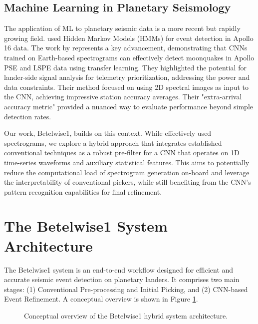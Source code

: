 \documentclass[11pt,a4paper]{article}
\begin{document}
\subsection{Machine Learning in Planetary Seismology}
The application of ML to planetary seismic data is a more recent but rapidly growing field. \citet{knapmeyer2015identification} used Hidden Markov Models (HMMs) for event detection in Apollo 16 data. The work by \citet{civilini2021detecting} represents a key advancement, demonstrating that CNNs trained on Earth-based spectrograms can effectively detect moonquakes in Apollo PSE and LSPE data using transfer learning. They highlighted the potential for lander-side signal analysis for telemetry prioritization, addressing the power and data constraints. Their method focused on using 2D spectral images as input to the CNN, achieving impressive station accuracy averages. Their "extra-arrival accuracy metric" provided a nuanced way to evaluate performance beyond simple detection rates.

Our work, Betelwise1, builds on this context. While \citet{civilini2021detecting} effectively used spectrograms, we explore a hybrid approach that integrates established conventional techniques as a robust pre-filter for a CNN that operates on 1D time-series waveforms and auxiliary statistical features. This aims to potentially reduce the computational load of spectrogram generation on-board and leverage the interpretability of conventional pickers, while still benefiting from the CNN's pattern recognition capabilities for final refinement.

\section{The Betelwise1 System Architecture}
The Betelwise1 system is an end-to-end workflow designed for efficient and accurate seismic event detection on planetary landers. It comprises two main stages: (1) Conventional Pre-processing and Initial Picking, and (2) CNN-based Event Refinement. A conceptual overview is shown in Figure \ref{fig:system_overview}.

\begin{figure}[H]
    \centering
    \caption{Conceptual overview of the Betelwise1 hybrid system architecture.}
    \label{fig:system_overview}
\end{figure}
\end{document}
